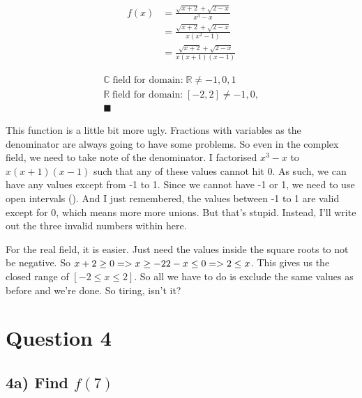 \documentclass[17 pt]{extarticle}
\begin{document}
\vspace{5mm}

\begin{equation*}
    \begin{split}
        f(x) &= \frac{\sqrt{x+2} + \sqrt{2-x}}{x^3-x} \\
        &= \frac{\sqrt{x+2} + \sqrt{2-x}}{x(x^2 - 1)} \\
        &= \frac{\sqrt{x+2} + \sqrt{2-x}}{x(x+1)(x-1)}
    \end{split}
    \end{equation*}

\vspace{5mm}

\begin{equation*}
    \begin{split}
        \mathbb{C} \; \text{field for domain:} \; \mathbb{R} \neq -1,0,1 \\
        \mathbb{R} \; \text{field for domain:} \; [-2,2] \neq -1, 0, \\ \blacksquare 
    \end{split}
    \end{equation*}

This function is a little bit more ugly. Fractions with variables as the denominator are always going to have some problems. So even in the complex field, 
we need to take note of the denominator. I factorised $ x^3-x $ to $ x(x+1)(x-1)$ such that any of these values cannot hit 0. As such, we can have any values except from -1 to 1.
Since we cannot have -1 or 1, we need to use open intervals (). And I just remembered, the values between -1 to 1 are valid except for 0, which means more more unions. But that's stupid.
Instead, I'll write out the three invalid numbers within here. 

\vspace{5mm}

For the real field, it is easier. Just need the values inside the square roots to not be negative. So $ x+2 \geq 0 => x \geq -2 \newline 2-x \leq 0  => 2 \leq x $. This gives us 
the closed range of $ [-2 \leq x \leq 2]$. So all we have to do is exclude the same values as before and we're done. So tiring, isn't it?

\section{Question 4}

\subsection*{4a) Find $f(7)$}
\vspace{5mm}
\end{document}
